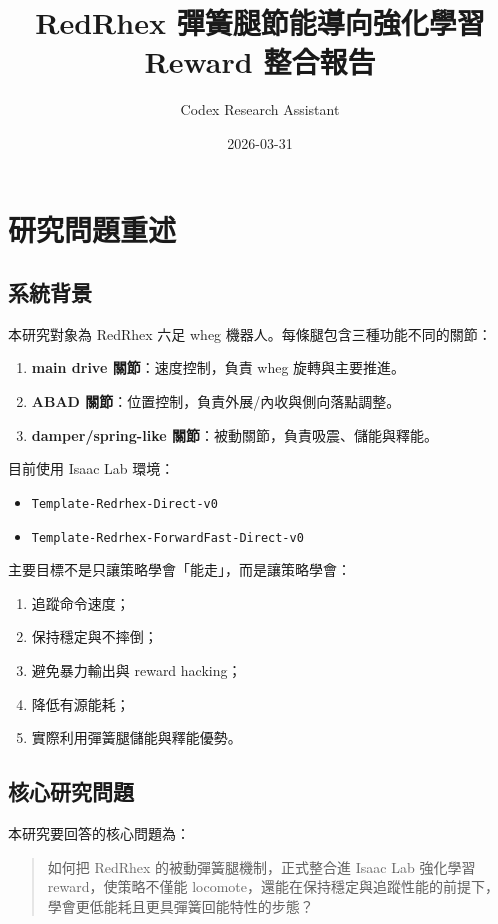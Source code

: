 \documentclass[12pt,a4paper,UTF8]{ctexart}
\title{RedRhex 彈簧腿節能導向強化學習 Reward 整合報告}
\author{Codex Research Assistant}
\date{2026-03-31}
\begin{document}
\maketitle
\tableofcontents
\newpage

\section{研究問題重述}

\subsection{系統背景}

本研究對象為 RedRhex 六足 wheg 機器人。每條腿包含三種功能不同的關節：

\begin{enumerate}[leftmargin=2em]
    \item \textbf{main drive 關節}：速度控制，負責 wheg 旋轉與主要推進。
    \item \textbf{ABAD 關節}：位置控制，負責外展/內收與側向落點調整。
    \item \textbf{damper/spring-like 關節}：被動關節，負責吸震、儲能與釋能。
\end{enumerate}

目前使用 Isaac Lab 環境：
\begin{itemize}[leftmargin=2em]
    \item \texttt{Template-Redrhex-Direct-v0}
    \item \texttt{Template-Redrhex-ForwardFast-Direct-v0}
\end{itemize}

主要目標不是只讓策略學會「能走」，而是讓策略學會：
\begin{enumerate}[leftmargin=2em]
    \item 追蹤命令速度；
    \item 保持穩定與不摔倒；
    \item 避免暴力輸出與 reward hacking；
    \item 降低有源能耗；
    \item 實際利用彈簧腿儲能與釋能優勢。
\end{enumerate}

\subsection{核心研究問題}

本研究要回答的核心問題為：

\begin{quote}
如何把 RedRhex 的被動彈簧腿機制，正式整合進 Isaac Lab 強化學習 reward，使策略不僅能 locomote，還能在保持穩定與追蹤性能的前提下，學會更低能耗且更具彈簧回能特性的步態？
\end{quote}
\end{document}
